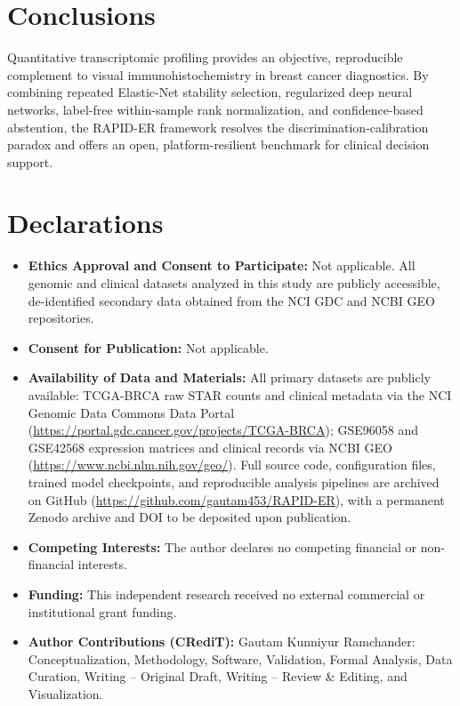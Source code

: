 \documentclass[11pt,a4paper]{article}
\begin{document}
\section{Conclusions}

Quantitative transcriptomic profiling provides an objective, reproducible complement to visual immunohistochemistry in breast cancer diagnostics. By combining repeated Elastic-Net stability selection, regularized deep neural networks, label-free within-sample rank normalization, and confidence-based abstention, the RAPID-ER framework resolves the discrimination-calibration paradox and offers an open, platform-resilient benchmark for clinical decision support.

\section*{Declarations}

\begin{itemize}
    \item \textbf{Ethics Approval and Consent to Participate:} Not applicable. All genomic and clinical datasets analyzed in this study are publicly accessible, de-identified secondary data obtained from the NCI GDC and NCBI GEO repositories.
    \item \textbf{Consent for Publication:} Not applicable.
    \item \textbf{Availability of Data and Materials:} All primary datasets are publicly available: TCGA-BRCA raw STAR counts and clinical metadata via the NCI Genomic Data Commons Data Portal (\url{https://portal.gdc.cancer.gov/projects/TCGA-BRCA}); GSE96058 and GSE42568 expression matrices and clinical records via NCBI GEO (\url{https://www.ncbi.nlm.nih.gov/geo/}). Full source code, configuration files, trained model checkpoints, and reproducible analysis pipelines are archived on GitHub (\url{https://github.com/gautam453/RAPID-ER}), with a permanent Zenodo archive and DOI to be deposited upon publication.
    \item \textbf{Competing Interests:} The author declares no competing financial or non-financial interests.
    \item \textbf{Funding:} This independent research received no external commercial or institutional grant funding.
    \item \textbf{Author Contributions (CRediT):} Gautam Kunniyur Ramchander: Conceptualization, Methodology, Software, Validation, Formal Analysis, Data Curation, Writing -- Original Draft, Writing -- Review \& Editing, and Visualization.
\end{itemize}
\end{document}
